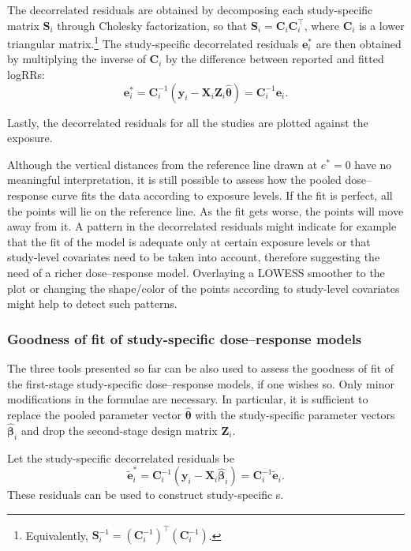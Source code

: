 The decorrelated residuals are obtained by decomposing each study-specific matrix $\mathbf{S}_i$ through Cholesky factorization, so that $\mathbf{S}_i=\mathbf{C}_i \mathbf{C}_i^\top$, where $\mathbf{C}_i$ is a lower triangular matrix.\footnote{Equivalently, $\mathbf{S}_i^{-1}=(\mathbf{C}_i^{-1})^\top (\mathbf{C}_i^{-1})$.} The study-specific decorrelated residuals $\mathbf{e}_i^*$ are then obtained by multiplying the inverse of $\mathbf{C}_i$ by the difference between reported and fitted logRRs:
\begin{equation*}
\mathbf{e}_i^* = \mathbf{C}_i^{-1}  \left(\mathbf{y}_i - \mathbf{X}_i \mathbf{Z}_i \hat{\boldsymbol{\theta}}\right) = \mathbf{C}_i^{-1} \mathbf{e}_i.
\end{equation*}

Lastly, the decorrelated residuals for all the studies are plotted against the exposure.

Although the vertical distances from the reference line drawn at $e^*=0$ have no meaningful interpretation, it is still possible to assess how the pooled dose--response curve fits the data according to exposure levels. If the fit is perfect, all the points will lie on the reference line. As the fit gets worse, the points will move away from it. A pattern in the decorrelated residuals might indicate for example that the fit of the model is adequate only at certain exposure levels or that study-level covariates need to be taken into account, therefore suggesting the need of a richer dose--response model. Overlaying a LOWESS smoother to the plot or changing the shape/color of the points according to study-level covariates might help to detect such patterns.


\subsubsection{Goodness of fit of study-specific dose--response models}

The three tools presented so far can be also used to assess the goodness of fit of the first-stage study-specific dose--response models, if one wishes so. Only minor modifications in the formulae are necessary. In particular, it is sufficient to replace the pooled parameter vector $\hat{\boldsymbol{\theta}}$ with the study-specific parameter vectors $\hat{\boldsymbol{\beta}}_i$ and drop the second-stage design matrix $\mathbf{Z}_i$.

Let the study-specific decorrelated residuals be
\begin{equation*}
\tilde{\mathbf{e}}_i^* = \mathbf{C}_i^{-1}  \left(\mathbf{y}_i - \mathbf{X}_i \hat{\boldsymbol{\beta}}_i\right) = \mathbf{C}_i^{-1} \tilde{\mathbf{e}}_i.
\end{equation*}
These residuals can be used to construct study-specific \rveplot s.

